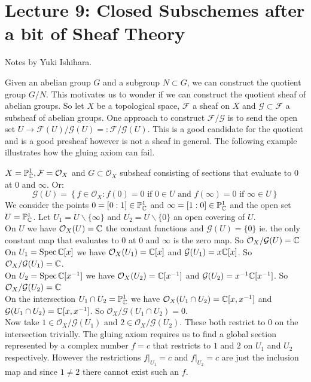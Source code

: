 \section*{Lecture 9: Closed Subschemes after a bit of Sheaf Theory}
Notes by Yuki Ishihara.

Given an abelian group \(G\) and a subgroup \(N \subset G\), we can construct the quotient group \(G/N\). This motivates us to wonder if we can construct the quotient sheaf of abelian groups.  So let $X$ be a topological space, $\mathcal{F}$ a sheaf on $X$ and $\mathcal{G} \subset \mathcal{F}$ a subsheaf of abelian groups. One approach to construct $\mathcal{F}/\mathcal{G}$ is to send the open set $U \to \mathcal{F}(U)/\mathcal{G}(U) =: \mathcal{F}/\mathcal{G}(U)$.  This is a good candidate for the quotient and is a good presheaf however is not a sheaf in general. The following example illustrates how the gluing axiom can fail.
\begin{example}
    $X = \mathbb{P}_{\mathbb{C}}^1, \mathcal{F} = \mathcal{O}_X$ and $G \subset \mathcal{O}_X$ subsheaf consisting of sections that evaluate to 0 at 0 and $\infty$. Or:
    $$\mathcal{G}(U) = \left\{f \in \mathcal{O}_X : f(0) = 0 \text{ if } 0 \in U \text{ and } f(\infty) = 0 \text{ if } \infty \in U\right\}$$
    We consider the points $0 = [0 : 1] \in \mathbb{P}_{\mathbb{C}}^1$ and $\infty = [1 : 0] \in \mathbb{P}_{\mathbb{C}}^1$ and the open set $U = \mathbb{P}^1_{\mathbb{C}}$. Let $U_1 = U\backslash \{\infty\}$ and $U_2 = U \backslash \{0\}$ an open covering of $U$. \smallskip \\
    On $U$ we have $\mathcal{O}_X(U) = \mathbb{C}$ the constant functions and $\mathcal{G}(U) = \{0\}$ ie. the only constant map that evaluates to 0 at 0 and $\infty$ is the zero map. So $\mathcal{O}_X/\mathcal{G}(U) = \mathbb{C}$ \smallskip \\
    On $U_1 = \operatorname{Spec}\mathbb{C}[x]$ we have $\mathcal{O}_X(U_1) = \mathbb{C}[x]$ and $\mathcal{G}(U_1) = x\mathbb{C}[x]$. So $\mathcal{O}_X/\mathcal{G}(U_1) = \mathbb{C}$. \smallskip \\
    On $U_2 = \operatorname{Spec}\mathbb{C}[x^{-1}]$ we have $\mathcal{O}_X(U_2) = \mathbb{C}[x^{-1}]$ and $\mathcal{G}(U_2) = x^{-1}\mathbb{C}[x^{-1}]$. So $\mathcal{O}_X/\mathcal{G}(U_2) = \mathbb{C}$ \smallskip \\
    On the intersection $U_1 \cap U_2 = \mathbb{P}^1_{\mathbb{C}}$ we have $\mathcal{O}_X(U_1 \cap U_2) = \mathbb{C}[x, x^{-1}]$ and $\mathcal{G}(U_1 \cap U_2) = \mathbb{C}[x, x^{-1}]$. So $\mathcal{O}_X/\mathcal{G}(U_1 \cap U_2) = 0$. \smallskip \\
    Now take $1 \in \mathcal{O}_X/\mathcal{G}(U_1)$ and $2 \in \mathcal{O}_X/\mathcal{G}(U_2)$. These both restrict to 0 on the intersection trivially. The gluing axiom requires us to find a global section represented by a complex number $f = c$ that restricts to $1$ and $2$ on $U_1$ and $U_2$ respectively. However the restrictions $f|_{U_1} = c$ and $f|_{U_2} = c$ are just the inclusion map and since $1 \neq 2$ there cannot exist such an $f$.
\end{example}
